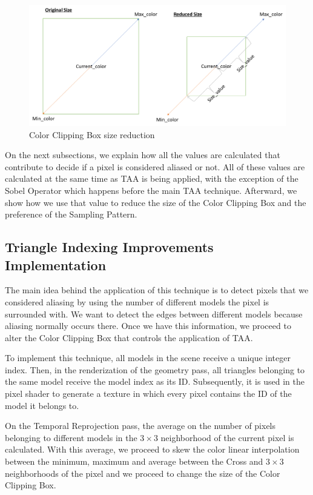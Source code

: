 \documentclass{cslthse-msc}
\begin{document}
\begin{figure}[!hbt]
	\centering
	\includegraphics[scale=0.7]{images/clipping_box_reduction.png}
	\caption{Color Clipping Box size reduction}\label{fig:colorclippingboxredux}
\end{figure}

On the next subsections, we explain how all the values are calculated that contribute to decide if a pixel is considered aliased or not. All of these values are calculated at the same time as TAA is being applied, with the exception of the Sobel Operator which happens before the main TAA technique. Afterward, we show how we use that value to reduce the size of the Color Clipping Box and the preference of the Sampling Pattern.

\subsection{Triangle Indexing Improvements Implementation}
The main idea behind the application of this technique is to detect pixels that we considered aliasing by using the number of different models the pixel is surrounded with. We want to detect the edges between different models because aliasing normally occurs there. Once we have this information, we proceed to alter the Color Clipping Box that controls the application of TAA.

To implement this technique, all models in the scene receive a unique integer index. Then, in the renderization of the geometry pass, all triangles belonging to the same model receive the model index as its ID. Subsequently, it is used in the pixel shader to generate a texture in which every pixel contains the ID of the model it belongs to.

On the Temporal Reprojection pass, the average on the number of pixels belonging to different models in the $3\times 3$ neighborhood of the current pixel is calculated. With this average, we proceed to skew the color linear interpolation between the minimum, maximum and average between the Cross and $3\times 3$ neighborhoods of the pixel and we proceed to change the size of the Color Clipping Box. 
\end{document}
